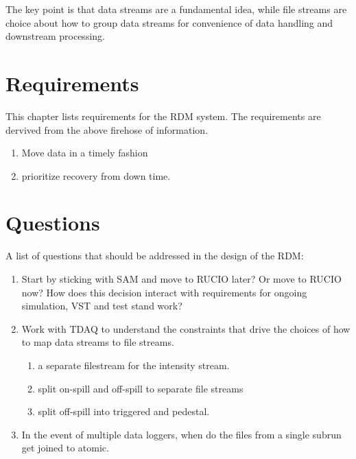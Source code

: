 The key point is that data streams are a fundamental idea,
while file streams are choice about how to group data streams for convenience of data handling and downstream processing.



\chapter{Requirements}

This chapter lists requirements for the RDM system.
The requirements are dervived from the above firehose of information.

\begin{enumerate}
  \item Move data in a timely fashion
  \item prioritize recovery from down time.
\end{enumerate}

\chapter{Questions}

A list of questions that should be addressed in the design of the RDM:

\begin{enumerate}
\item Start by sticking with SAM and move to RUCIO later?  Or move to RUCIO now?
  How does this decision interact with requirements for ongoing simulation, VST
  and test stand work?
\item Work with TDAQ to understand the constraints that drive the choices of how to
  map data streams to file streams.
  \begin{enumerate}
    \item a separate filestream for the intensity stream.
    \item split on-spill and off-spill to separate file streams
    \item split off-spill into triggered and pedestal.
  \end{enumerate}
\item In the event of multiple data loggers, when do the files from a single subrun get joined to atomic.
\end{enumerate}


